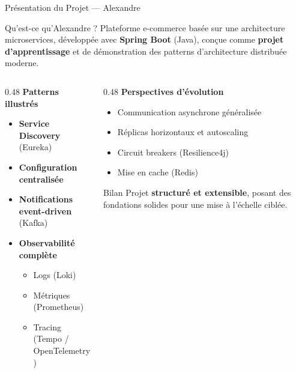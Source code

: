 \documentclass[aspectratio=169]{beamer}
\begin{document}
\begin{frame}{Présentation du Projet — Alexandre}

  \begin{block}{\faShoppingCart\quad Qu'est-ce qu'Alexandre ?}
    Plateforme e-commerce basée sur une architecture microservices, développée avec
    \textbf{Spring Boot} (Java), conçue comme \textbf{projet d'apprentissage} et de
    démonstration des patterns d'architecture distribuée moderne.
  \end{block}

  \vspace{0.6em}

  \begin{columns}[T]
    \begin{column}{0.48\textwidth}
      \textbf{\color{primary}Patterns illustrés}
      \begin{itemize}
        \item \faSearch\; \textbf{Service Discovery} (Eureka)
        \item \faCog\; \textbf{Configuration centralisée}
        \item \faBell\; \textbf{Notifications event-driven} (Kafka)
        \item \faChartLine\; \textbf{Observabilité complète}
              \begin{itemize}
                \item Logs (Loki)
                \item Métriques (Prometheus)
                \item Tracing (Tempo / OpenTelemetry)
              \end{itemize}
      \end{itemize}
    \end{column}
    \begin{column}{0.48\textwidth}
      \textbf{\color{primary}Perspectives d'évolution}
      \begin{itemize}
        \item Communication \alert{asynchrone} généralisée
        \item \alert{Réplicas horizontaux} et autoscaling
        \item \alert{Circuit breakers} (Resilience4j)
        \item Mise en \alert{cache} (Redis)
      \end{itemize}

      \vspace{0.6em}
      \begin{alertblock}{\small Bilan}
        \small Projet \textbf{structuré et extensible}, posant des
        fondations solides pour une mise à l'échelle ciblée.
      \end{alertblock}
    \end{column}
  \end{columns}

\end{frame}
\end{document}
